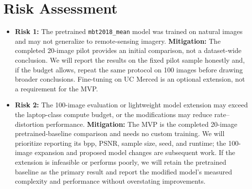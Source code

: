 \documentclass[11pt]{article}
\begin{document}
\section{Risk Assessment}
\label{sec:risk}
\begin{itemize}[leftmargin=*]
  \item \textbf{Risk 1:} The pretrained \texttt{mbt2018\_mean} model was trained on natural images and may not generalize to remote-sensing imagery. \textbf{Mitigation:} The completed 20-image pilot provides an initial comparison, not a dataset-wide conclusion. We will report the results on the fixed pilot sample honestly and, if the budget allows, repeat the same protocol on 100 images before drawing broader conclusions. Fine-tuning on UC Merced is an optional extension, not a requirement for the MVP.
  \item \textbf{Risk 2:} The 100-image evaluation or lightweight model extension may exceed the laptop-class compute budget, or the modifications may reduce rate--distortion performance. \textbf{Mitigation:} The MVP is the completed 20-image pretrained-baseline comparison and needs no custom training. We will prioritize reporting its bpp, PSNR, sample size, seed, and runtime; the 100-image expansion and proposed model changes are subsequent work. If the extension is infeasible or performs poorly, we will retain the pretrained baseline as the primary result and report the modified model's measured complexity and performance without overstating improvements.
\end{itemize}
\end{document}
